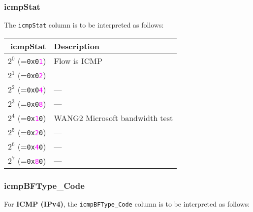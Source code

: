 \documentclass[documentation]{subfiles}
\begin{document}
\subsubsection{icmpStat}\label{icmpStat}
The {\tt icmpStat} column is to be interpreted as follows:
\begin{longtable}{rl}
    \toprule
    {\bf icmpStat} & {\bf Description}\\
    \midrule\endhead%
    $2^0$ (={\tt 0x0\textcolor{magenta}{1}}) & Flow is ICMP\\
    $2^1$ (={\tt 0x0\textcolor{magenta}{2}}) & ---\\
    $2^2$ (={\tt 0x0\textcolor{magenta}{4}}) & ---\\
    $2^3$ (={\tt 0x0\textcolor{magenta}{8}}) & ---\\
    $2^4$ (={\tt 0x\textcolor{magenta}{1}0}) & WANG2 Microsoft bandwidth test\\
    $2^5$ (={\tt 0x\textcolor{magenta}{2}0}) & ---\\
    $2^6$ (={\tt 0x\textcolor{magenta}{4}0}) & ---\\
    $2^7$ (={\tt 0x\textcolor{magenta}{8}0}) & ---\\
    \bottomrule
\end{longtable}

\subsubsection{icmpBFType\_Code}\label{icmpBFTypeCode}

For {\bf ICMP (IPv4)}, the {\tt icmpBFType\_Code} column is to be interpreted as follows:
\end{document}
